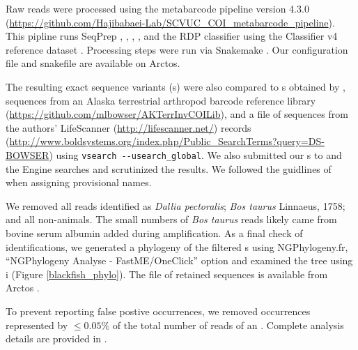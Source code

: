 \begin{multicols}{2} 

Raw reads were processed using the   metabarcode pipeline version 4.3.0 (\url{https://github.com/Hajibabaei-Lab/SCVUC_COI_metabarcode_pipeline}). This pipline runs SeqPrep \citep{StJohn2016},  \citep{Martin2011},  \citep{Rognes2016},  \citep{Edgar2016}, and the RDP classifier \citep{Wang2007} using the  Classifier v4 reference dataset \citep{PorterHajibabaei2018}. Processing steps were run via Snakemake \citep{KosterRahmann2012}. Our  configuration file \citep{Bowser2020config} and snakefile \citep{Bowser2020snakefile} are available on Arctos.

The resulting exact sequence variants (s) were also compared to s obtained by \citet{Bowseretal2020} \citep[dataset: ][]{Bowseretal2020sup5}, sequences from an Alaska terrestrial arthropod  barcode  reference library (\url{https://github.com/mlbowser/AKTerrInvCOILib}), and a  file of sequences from the authors' LifeScanner (\url{http://lifescanner.net/}) records (\url{http://www.boldsystems.org/index.php/Public_SearchTerms?query=DS-BOWSER}) using \verb|vsearch --usearch_global|. We also submitted our s to   \citep{Johnsonetal2008} and the   Engine \citep{Ratnasinghametal2007} searches  and scrutinized the results. We followed the guidlines of \citet{Sigovinietal2016} when assigning provisional names.

We removed all reads identified as \textit{Dallia pectoralis}; \textit{Bos taurus} Linnaeus, 1758; and all non-animals. The small numbers of \textit{Bos taurus} reads likely came from bovine serum albumin added during  amplification. As a final check of identifications, we generated a phylogeny of the filtered s using NGPhylogeny.fr, ``NGPhylogeny Analyse - FastME/OneClick'' option \citep{DesperGascuel2002, CriscuoloGribaldo2010, JunierZdobnov2010, KatohStandley2013, Lefortetal2015, Lemoineetal2019} and examined the tree using i \citep{LetunicBork2019} (Figure \ref{blackfish_phylo}). The  file of retained  sequences is available from Arctos \citep{Bowser2020bfdfas}. 


To prevent reporting false postive occurrences, we removed occurrences represented by $\leq 0.05\%$ of the total number of reads of an . Complete analysis details are provided in \citet{bowser2020}.


\end{multicols}

